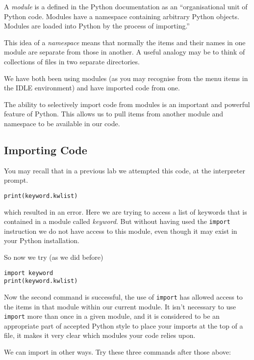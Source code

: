 \documentclass[12pt,oneside]{cttutorial}
\begin{document}
A \emph{module} is a defined in the Python documentation as an ``organisational unit of Python code. Modules have a namespace containing arbitrary Python objects. Modules are loaded into Python by the process of importing.''

This idea of a \emph{namespace} means that normally the items and their names in one module are separate from those in another. A useful analogy may be to think of collections of files in two separate directories.

We have both been using modules (as you may recognise from the menu items in the IDLE environment) and have imported code from one.

The ability to selectively import code from modules is an important and powerful feature of Python. This allows us to pull items from another module and namespace to be available in our code.

\subsection{Importing Code}

You may recall that in a previous lab we attempted this code, at the interpreter prompt.

\begin{lstlisting}
print(keyword.kwlist)
\end{lstlisting}

which resulted in an error. Here we are trying to access a list of keywords that is contained in a module called \emph{keyword}. But without having used the \lstinline!import! instruction we do not have access to this module, even though it may exist in your Python installation.

So now we try (as we did before)

\begin{lstlisting}
import keyword
print(keyword.kwlist)
\end{lstlisting}

Now the second command is successful, the use of \lstinline!import! has allowed access to the items in that module within our current module. It isn't necessary to use \lstinline!import! more than once in a given module, and it is considered to be an appropriate part of accepted Python style to place your imports at the top of a file, it makes it very clear which modules your code relies upon.

We can import in other ways. Try these three commands after those above:
\end{document}
